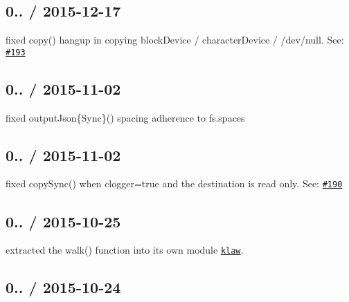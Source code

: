\subsection*{0.. / 2015-\/12-\/17 }


\begin{DoxyItemize}
\item fixed {\ttfamily copy()} hangup in copying block\+Device / character\+Device / {\ttfamily /dev/null}. See\+: \href{https://github.com/jprichardson/node-fs-extra/issues/193}{\tt \#193}
\end{DoxyItemize}

\subsection*{0.. / 2015-\/11-\/02 }


\begin{DoxyItemize}
\item fixed {\ttfamily output\+Json\{Sync\}()} spacing adherence to {\ttfamily fs.\+spaces}
\end{DoxyItemize}

\subsection*{0.. / 2015-\/11-\/02 }


\begin{DoxyItemize}
\item fixed {\ttfamily copy\+Sync()} when {\ttfamily clogger=true} and the destination is read only. See\+: \href{https://github.com/jprichardson/node-fs-extra/pull/190}{\tt \#190}
\end{DoxyItemize}

\subsection*{0.. / 2015-\/10-\/25 }


\begin{DoxyItemize}
\item extracted the {\ttfamily walk()} function into its own module \href{https://github.com/jprichardson/node-klaw}{\tt {\ttfamily klaw}}.
\end{DoxyItemize}

\subsection*{0.. / 2015-\/10-\/24 }



